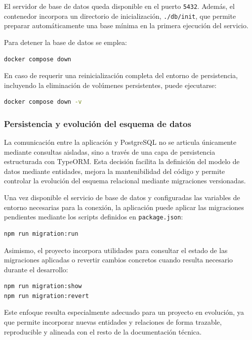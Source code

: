 El servidor de base de datos queda disponible en el puerto \texttt{5432}. Además, el contenedor incorpora un directorio de inicialización, \texttt{./db/init}, que permite preparar automáticamente una base mínima en la primera ejecución del servicio.

Para detener la base de datos se emplea:

\begin{lstlisting}[language=bash]
docker compose down
\end{lstlisting}

En caso de requerir una reinicialización completa del entorno de persistencia, incluyendo la eliminación de volúmenes persistentes, puede ejecutarse:

\begin{lstlisting}[language=bash]
docker compose down -v
\end{lstlisting}

\subsubsection*{Persistencia y evolución del esquema de datos}

La comunicación entre la aplicación y PostgreSQL no se articula únicamente mediante consultas aisladas, sino a través de una capa de persistencia estructurada con TypeORM. Esta decisión facilita la definición del modelo de datos mediante entidades, mejora la mantenibilidad del código y permite controlar la evolución del esquema relacional mediante migraciones versionadas.

Una vez disponible el servicio de base de datos y configuradas las variables de entorno necesarias para la conexión, la aplicación puede aplicar las migraciones pendientes mediante los scripts definidos en \texttt{package.json}:

\begin{lstlisting}[language=bash]
npm run migration:run
\end{lstlisting}

Asimismo, el proyecto incorpora utilidades para consultar el estado de las migraciones aplicadas o revertir cambios concretos cuando resulta necesario durante el desarrollo:

\begin{lstlisting}[language=bash]
npm run migration:show
npm run migration:revert
\end{lstlisting}

Este enfoque resulta especialmente adecuado para un proyecto en evolución, ya que permite incorporar nuevas entidades y relaciones de forma trazable, reproducible y alineada con el resto de la documentación técnica.

